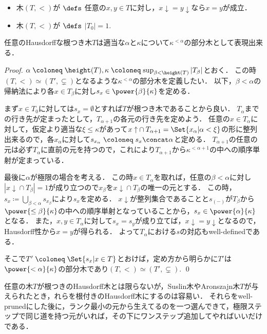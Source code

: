 \documentclass[a4j]{ltjsarticle}
\renewcommand{\defeq}{\mathrel{\coloneq}}
\renewcommand{\emph}[1]{\textsf{\textgt{#1}}}
\begin{document}
\begin{definition}
 \begin{itemize}
  \item 木$(T, <)$が\emph{Hausdorff} $\defs$ 任意の$x, y \in T$に対し，$\mathord{x\downarrow} = \mathord{y \downarrow}$なら$x = y$が成立．
  \item 木$(T, <)$が\emph{根つき木} $\defs$ $|T_0| = 1$.
 \end{itemize}
\end{definition}
\begin{lemma}
 任意のHausdorffな根つき木$T$は適当な$\alpha$と$\kappa$について$\kappa^{<\alpha}$の部分木として表現出来る．
\end{lemma}
\begin{proof}
 $\alpha \defeq \height(T), \kappa \defeq \sup_{\beta < \height(T)} |T_\beta|$とおく．
 この時$(T, <) \simeq (T', \subsetneq)$となるような$\kappa^{<\alpha}$の部分木を定義したい．
 以下，$\beta < \alpha$の帰納法により各$x \in T_\beta$に対し$s_x \in \power{\beta}{\kappa}$を定める．

 まず$x \in T_0$に対しては$s_x = \emptyset$とすれば$T$が根つき木であることから良い．
 $T_\alpha$までの行き先が定まったとして，$T_{\alpha+1}$の各元の行き先を定めよう．
 任意の$x \in T_{\alpha}$に対して，仮定より適当な$\xi \leq \kappa$があって$\mathord{x \uparrow} \cap T_{\alpha+1} = \Set{ x_\alpha | \alpha < \xi}$の形に整列出来るので，各$x_\alpha$に対して$s_{x_\alpha} \defeq s_x \concat \alpha$と定める．
 $T_{\alpha+1}$の任意の元は必ず$T_\alpha$に直前の元を持つので，これにより$T_{\alpha+1}$から$\kappa^{<\alpha+1}$の中への順序単射が定まっている．

 最後に$\alpha$が極限の場合を考える．
 この時$x \in T_\alpha$を取れば，任意の$\beta < \alpha$に対し$|\mathord{x \downarrow} \cap T_\beta| = 1$が成り立つので$x_\beta$を$\mathord{x \downarrow} \cap T_\beta$の唯一の元とする．
 この時，$s_x \defeq \bigcup_{\beta < \alpha} s_{x_\beta}$により$s_x$を定める．
 $x\downarrow$が整列集合であることと$s_{(-)}$が$T_\beta$から$\power{\leq\beta}{\kappa}$の中への順序単射となっていることから，$s_x \in \power{\alpha}{\kappa}$となる．
 また，$x, y \in T_\alpha$に対して$s_x = s_y$が成り立てば，$\mathord{x \downarrow} = \mathord{y \downarrow}$となるので，Hausdorff性から$x = y$が得られる．
 よって$T_\alpha$における$s$の対応もwell-definedである．

 そこで$T' \defeq \Set{ s_x | x \in T}$とおけば，定め方から明らかに$T'$は$\power{<\alpha}{\kappa}$の部分木であり$(T, <) \simeq (T', \subsetneq)$. \qed
\end{proof}

任意の木$T$が根つきのHausdorff木とは限らないが，Suslin木やAronszajn木$T$が与えられたとき，れらを根付きのHausdorff木にするのは容易い．
それらをwell-prunedにした後に，ランク最小の元から生えてるのを一つ選んできて，極限ステップで同じ道を持つ元がいれば，その下にワンステップ追加してやればいいだけである．

\nocite{Shelah:1984,Kunen:1980,Jech:2002}
\nocite{Bekkali:1991bv,Miyazaki:2013fv,Kunen:2011}
\printbibliography[title=参考文献]
\end{document}
